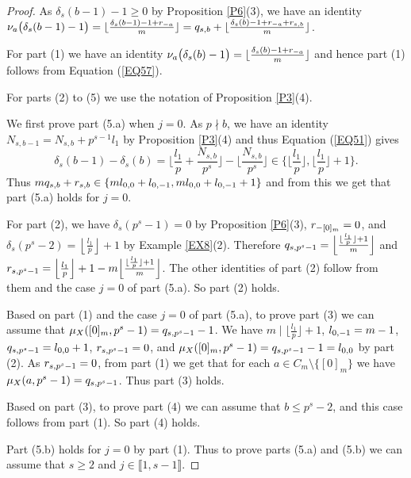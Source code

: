 \documentclass[10pt,a4paper]{amsart}
\def\l{\textup{l}}
\def\q{\textup{q}}
\def\r{\textup{r}}
\begin{document}
\begin{proof}
As $\delta_s(b-1)-1\ge 0$ by Proposition \ref{P6}(3), we have an identity $\nu_a\bigl(\delta_s(b-1)-1\bigr)=\lfloor\frac{\delta_s(b-1)-1+\r_{-a}}{m}\rfloor=\q_{s,b}+\lfloor\frac{\delta_s(b)-1+\r_{-a}+\r_{s,b}}{m}\rfloor$. 

For part (1) we have an identity $\nu_a\bigl(\delta_s(b)-1\bigr)=\lfloor\frac{\delta_s(b)-1+\r_{-a}}{m}\rfloor$ and hence part (1) follows from Equation (\ref{EQ57}).

For parts (2) to (5) we use the notation of Proposition \ref{P3}(4). 

We first prove part (5.a) when $j=0$. As $p\nmid b$, we have an identity $N_{s,b-1}=N_{s,b}+p^{s-1}l_1$ by Proposition \ref{P3}(4) and thus Equation (\ref{EQ51}) gives
\begin{equation}\label{EQ60}
\delta_s(b-1)-\delta_s(b)=\Big\lfloor\frac{l_1}{p}+\frac{N_{s,b}}{p^s}\Big\rfloor-\Big\lfloor\frac{N_{s,b}}{p^s}\Big\rfloor\in\Big\{\Big\lfloor\frac{l_1}{p}\Big\rfloor,\Big\lfloor\frac{l_1}{p}\Big\rfloor+1\Big\}.
\end{equation}
Thus $m\q_{s,b}+\r_{s,b}\in\{m\l_{0,0}+\l_{0,-1},m\l_{0,0}+\l_{0,-1}+1\}$ and from this we get that part (5.a) holds for $j=0$.

For part (2), we have $\delta_s(p^s-1)=0$ by Proposition \ref{P6}(3), $\r_{-[0]_m}=0$, and $\delta_s(p^s-2)=\left\lfloor \frac{l_1}{p}\right\rfloor+1$ by Example \ref{EX8}(2). Therefore $\q_{s,p^s-1}=\Big\lfloor\frac{\lfloor \frac{l_1}{p}\rfloor+1}{m}\Big\rfloor$ and $\r_{s,p^s-1}=\Big\lfloor \frac{l_1}{p}\Big\rfloor+1-m\Big\lfloor\frac{\lfloor \frac{l_1}{p}\rfloor+1}{m}\Big\rfloor$. The other identities of part (2) follow from them and the case $j=0$ of part (5.a). So part (2) holds. 

Based on part (1) and the case $j=0$ of part (5.a), to prove part (3) we can assume that $\mu_X([0]_m,p^s-1)=\q_{s,p^s-1}-1$. We have $m\mid\lfloor \frac{l_1}{p}\rfloor+1$, $\l_{0,-1}=m-1$, $\q_{s,p^s-1}=\l_{0,0}+1$, $\r_{s,p^s-1}=0$, and $\mu_X([0]_m,p^s-1)=\q_{s,p^s-1}-1=\l_{0,0}$ by part (2).  As $\r_{s,p^s-1}=0$, from part (1) we get that for each $a\in C_m\setminus\{[0]_m\}$ we have $\mu_X(a,p^s-1)=\q_{s,p^s-1}$. Thus part (3) holds.

Based on part (3), to prove part (4) we can assume that $b\le p^s-2$, and this case follows from part (1). So part (4) holds. 

Part (5.b) holds for $j=0$ by part (1). Thus to prove parts (5.a) and (5.b) we can assume that $s\ge 2$ and $j\in\llbracket1,s-1\rrbracket$. 


\end{proof}
\end{document}
